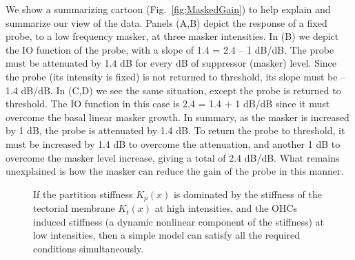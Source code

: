 \documentclass{ws-p8-50x6-00}
\newcommand{\Fig}[1]{Fig.~\ref{fig:#1}}
\begin{document}
We show a summarizing cartoon (\Fig{MaskedGain}) to help explain and summarize
our view of the data. Panels (A,B) depict the response of a fixed probe,
to a low frequency masker, at three masker intensities.
In (B) we depict the IO function of the
probe, with a slope of 1.4 = 2.4 -- 1 dB/dB. The probe must be attenuated
by 1.4 dB for every dB of suppressor (masker) level.
Since the probe (its intensity is fixed) is not returned to threshold,
its slope must be --1.4 dB/dB.
In (C,D) we see the same situation, except
the probe is returned to threshold.
The IO function in this case is 2.4 = 1.4 + 1 dB/dB
since it must overcome the basal linear masker growth.
In summary, as the masker
is increased by 1 dB, the probe is attenuated by 1.4 dB. To return the
probe to threshold, it must be increased by 1.4 dB to overcome the
attenuation, and another 1 dB to overcome the masker level increase,
giving a total of 2.4 dB/dB. What remains unexplained is how the masker
can reduce the gain of the probe in this manner.

\begin{figure}[ht]
\begin{minipage}[c]{2.75in}
	\begin{center}
	\end{center}
\end{minipage}
\hfill
\begin{minipage}[c]{1.25in}
\caption{ \small \setlength{\baselineskip}{.1em}
If the partition stiffness $K_p(x)$ is dominated by the stiffness of the tectorial
membrane $K_t(x)$ at high intensities, and the OHCs induced stiffness (a dynamic
nonlinear component of the stiffness) at low intensities, then a simple model can
satisfy all the required conditions simultaneously.
\label{fig:rectamodel}
}
\end{minipage}
\end{figure}
\end{document}
